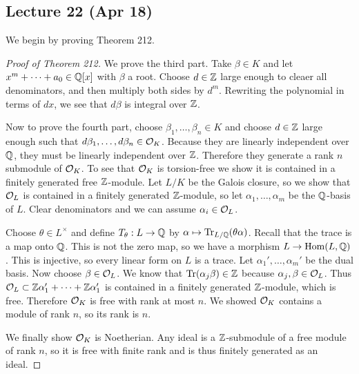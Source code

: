 \documentclass[10pt, twoside]{article}
\begin{document}
        \subsection{Lecture 22 (Apr 18)} We begin by proving Theorem 212.
        \begin{proof}[Proof of Theorem 212] We prove the third part. Take
            $\beta \in K$ and let $x^m + \cdots + a_0 \in \mathbb{Q}[x]$ with $\beta$ a
            root. Choose $d \in \mathbb{Z}$ large enough to cleaer all denominators,
            and then multiply both sides by $d^m$. Rewriting the polynomial in
            terms of $dx$, we see that $d\beta$ is integral over $\mathbb{Z}$.

            Now to prove the fourth part, choose $\beta_1, \ldots, \beta_n \in
            K$ and choose $d \in \mathbb{Z}$ large enough such that $d\beta_1, \ldots,
            d \beta_n \in \mathcal{O}_K$. Because they are linearly independent over
            $\mathbb{Q}$, they must be linearly independent over $\mathbb{Z}$. Therefore they
            generate a rank $n$ submodule of $\mathcal{O}_K$. To see that $\mathcal{O}_K$
            is torsion-free we show it is contained in a finitely generated
            free $\mathbb{Z}$-module. Let $L/K$ be the Galois closure, so we show that
            $\mathcal{O}_L$ is contained in a finitely generated $\mathbb{Z}$-module, so let
            $\alpha_1, \ldots, \alpha_m$ be the $\mathbb{Q}$-basis of $L$. Clear
            denominators and we can assume $\alpha_i \in \mathcal{O}_L$. 
            
            Choose $\theta \in L^{\times}$ and define $T_{\theta}:L \to \mathbb{Q}$ by
            $\alpha \mapsto \mathrm{Tr}_{L/\mathbb{Q}}(\theta \alpha)$. Recall that the
            trace is a map onto $\mathbb{Q}$. This is not the zero map, so we have a
            morphism $L \to \operatorname{Hom}(L,\mathbb{Q})$. This is injective, so
            every linear form on $L$ is a trace. Let $\alpha_1', \ldots,
            \alpha_m'$ be the dual basis. Now choose $\beta \in \mathcal{O}_L$. We
            know that $\mathrm{Tr}(\alpha_j\beta) \in \mathbb{Z}$ because $\alpha_j,
            \beta \in \mathcal{O}_L$. Thus $\mathcal{O}_L \subset \mathbb{Z} \alpha_1' + \cdots +
            \mathbb{Z} \alpha_1'$ is contained in a finitely generated $\mathbb{Z}$-module,
            which is free. Therefore $\mathcal{O}_K$ is free with rank at most $n$.
            We showed $\mathcal{O}_K$ contains a module of rank $n$, so its rank is
            $n$.

            We finally show $\mathcal{O}_K$ is Noetherian. Any ideal is a
        $\mathbb{Z}$-submodule of a free module of rank $n$, so it is free with finite
    rank and is thus finitely generated as an ideal.  \end{proof}
\end{document}
